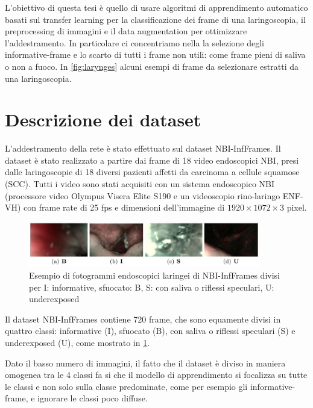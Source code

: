 L'obiettivo di questa tesi è quello di usare algoritmi di apprendimento automatico basati sul transfer learning per la classificazione dei frame di una laringoscopia, il  preprocessing di immagini e il data augmentation per ottimizzare l'addestramento. In particolare ci concentriamo nella la selezione degli informative-frame e lo scarto di tutti i frame non utili: come frame pieni di saliva o non a fuoco. In \cref{fig:larynges} alcuni esempi di frame da selezionare estratti da una laringoscopia.

\section{Descrizione dei dataset}\label{descrizione-dei-dataset}

L'addestramento della rete è stato effettuato  sul dataset
NBI-InfFrames. Il dataset
è stato realizzato a partire dai frame di 18 video endoscopici NBI, presi dalle laringoscopie di
18 diversi pazienti affetti da carcinoma a cellule squamose
(SCC). Tutti i video sono stati acquisiti con un sistema endoscopico
NBI (processore video Olympus Visera Elite S190 e
un videoscopio rino-laringo ENF-VH) con frame rate di
25 fps e dimensioni dell'immagine di \(1920\times 1072\times 3\) pixel.

\begin{figure}[ht]
    \centering
    \includegraphics[width=0.9\textwidth]{introduzione/Larynge.jpg}
    \caption[Esempio di fotogrammi endoscopici laringei di NBI-InfFrames]{Esempio di fotogrammi endoscopici laringei di NBI-InfFrames divisi per I: informative, sfuocato: B, S: con
    saliva o riflessi speculari,
    U: underexposed}
    \label{fig:larynges-2}
\end{figure}

Il dataset NBI-InfFrames contiene 720 frame, che sono equamente divisi in quattro classi: informative (I), sfuocato (B), con saliva o riflessi speculari (S) e underexposed  (U), come mostrato in \cref{fig:larynges-2}. 

Dato il basso numero di immagini, il fatto che il dataset è diviso in maniera omogenea tra le 4 classi fa si che il modello di apprendimento si focalizza su tutte le classi e non solo sulla classe predominate, come per esempio gli informative-frame, e ignorare le classi poco diffuse.

